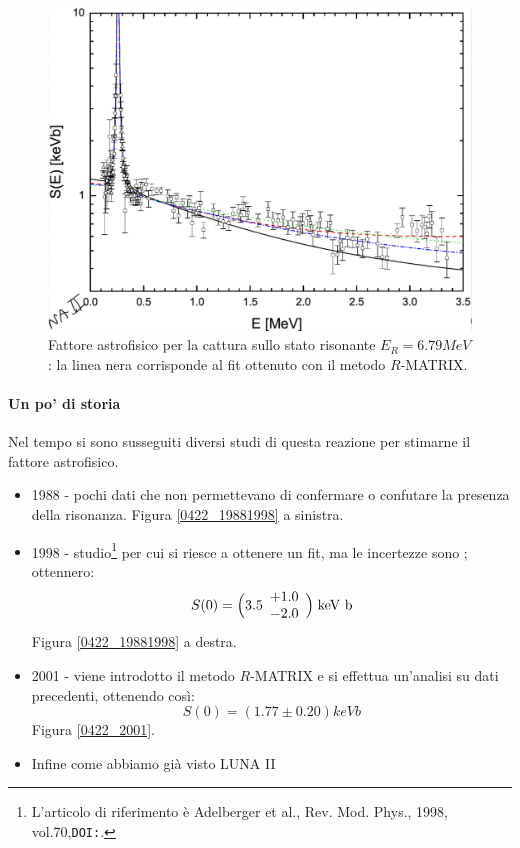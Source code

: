 \begin{itemize}
	\begin{figure}[h]
		\centering
		\includegraphics[scale=0.5]{Immagini/0422_0-Se-2.png}
		\caption{Fattore astrofisico per la cattura sullo stato risonante $E_R=6.79\unit{MeV}$: la linea nera corrisponde al fit ottenuto con il metodo $R$-MATRIX.}
		\label{0422_Er2}
	\end{figure}	
\end{itemize}

\paragraph{Un po' di storia}
Nel tempo si sono susseguiti diversi studi di questa reazione per stimarne il fattore astrofisico.
\begin{itemize}
	\item 1988 - pochi dati che non permettevano di confermare o confutare la presenza della risonanza. Figura \ref{0422_19881998} a sinistra.
	\item 1998 - studio\footnote{L'articolo di riferimento è Adelberger et al., Rev. Mod. Phys., 1998, vol.70,\texttt{DOI:}.} per cui si riesce a ottenere un fit, ma le incertezze sono ; ottennero:
	$$S(0)= \Bigl ( 3.5\begin{array}{l}
		+1.0 \\
		-2.0
	\end{array}%
	\Bigr )\unit{keV b}$$
	Figura \ref{0422_19881998} a destra.
	\item 2001 - viene introdotto il metodo $R$-MATRIX e si effettua un'analisi su dati precedenti, ottenendo così:
	$$S(0) = (1.77 \pm 0.20) \unit{keV b}$$
	Figura \ref{0422_2001}.
	\item Infine come abbiamo già visto LUNA II
\end{itemize}



